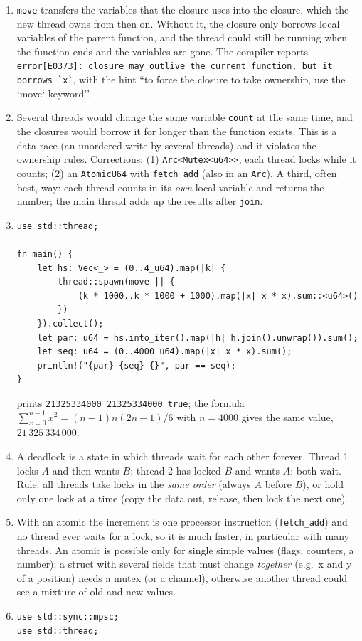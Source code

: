 \begin{enumerate}[label=\textbf{\ansnum.\arabic*}]
  \item \verb!move! transfers the variables that the closure uses into the closure, which the new thread owns from then on. Without it, the closure only borrows local variables of the parent function, and the thread could still be running when the function ends and the variables are gone. The compiler reports \verb!error[E0373]: closure may outlive the current function, but it borrows `x`!, with the hint ``to force the closure to take ownership, use the `move` keyword''.
  \item Several threads would change the same variable \verb!count! at the same time, and the closures would borrow it for longer than the function exists. This is a data race (an unordered write by several threads) and it violates the ownership rules. Corrections: (1) \verb!Arc<Mutex<u64>>!, each thread locks while it counts; (2) an \verb!AtomicU64! with \verb!fetch_add! (also in an \verb!Arc!). A third, often best, way: each thread counts in its \emph{own} local variable and returns the number; the main thread adds up the results after \verb!join!.
  \item
\begin{verbatim}
use std::thread;

fn main() {
    let hs: Vec<_> = (0..4_u64).map(|k| {
        thread::spawn(move || {
            (k * 1000..k * 1000 + 1000).map(|x| x * x).sum::<u64>()
        })
    }).collect();
    let par: u64 = hs.into_iter().map(|h| h.join().unwrap()).sum();
    let seq: u64 = (0..4000_u64).map(|x| x * x).sum();
    println!("{par} {seq} {}", par == seq);
}
\end{verbatim}
prints \verb!21325334000 21325334000 true!; the formula $\sum_{x=0}^{n-1}x^2=(n-1)n(2n-1)/6$ with $n=4000$ gives the same value, $21\,325\,334\,000$.
  \item A deadlock is a state in which threads wait for each other forever. Thread 1 locks $A$ and then wants $B$; thread 2 has locked $B$ and wants $A$: both wait. Rule: all threads take locks in the \emph{same order} (always $A$ before $B$), or hold only one lock at a time (copy the data out, release, then lock the next one).
  \item With an atomic the increment is one processor instruction (\verb!fetch_add!) and no thread ever waits for a lock, so it is much faster, in particular with many threads. An atomic is possible only for single simple values (flags, counters, a number); a struct with several fields that must change \emph{together} (e.g.\ x and y of a position) needs a mutex (or a channel), otherwise another thread could see a mixture of old and new values.
  \item
\begin{verbatim}
use std::sync::mpsc;
use std::thread;


\end{verbatim}
\end{enumerate}
